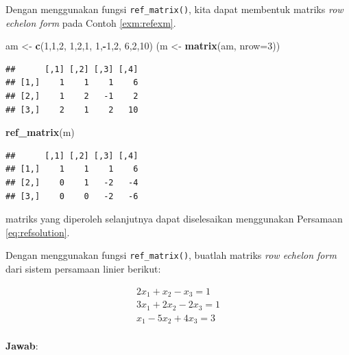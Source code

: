 \documentclass[]{book}
\newenvironment{Shaded}{\begin{snugshade}}{\end{snugshade}}
\newcommand{\DataTypeTok}[1]{\textcolor[rgb]{0.13,0.29,0.53}{#1}}
\newcommand{\DecValTok}[1]{\textcolor[rgb]{0.00,0.00,0.81}{#1}}
\newcommand{\KeywordTok}[1]{\textcolor[rgb]{0.13,0.29,0.53}{\textbf{#1}}}
\newcommand{\NormalTok}[1]{#1}
\newcommand{\OperatorTok}[1]{\textcolor[rgb]{0.81,0.36,0.00}{\textbf{#1}}}
\newcommand{\StringTok}[1]{\textcolor[rgb]{0.31,0.60,0.02}{#1}}
\theoremstyle{definition}
\theoremstyle{definition}
\theoremstyle{definition}
\theoremstyle{remark}
\let\BeginKnitrBlock\begin \let\EndKnitrBlock\end
\begin{document}
Dengan menggunakan fungsi \texttt{ref\_matrix()}, kita dapat membentuk matriks \emph{row echelon form} pada Contoh \ref{exm:refexm}.

\begin{Shaded}
\begin{Highlighting}[]
\NormalTok{am <-}\StringTok{ }\KeywordTok{c}\NormalTok{(}\DecValTok{1}\NormalTok{,}\DecValTok{1}\NormalTok{,}\DecValTok{2}\NormalTok{,}
        \DecValTok{1}\NormalTok{,}\DecValTok{2}\NormalTok{,}\DecValTok{1}\NormalTok{,}
        \DecValTok{1}\NormalTok{,}\OperatorTok{-}\DecValTok{1}\NormalTok{,}\DecValTok{2}\NormalTok{,}
        \DecValTok{6}\NormalTok{,}\DecValTok{2}\NormalTok{,}\DecValTok{10}\NormalTok{)}
\NormalTok{(m <-}\StringTok{ }\KeywordTok{matrix}\NormalTok{(am, }\DataTypeTok{nrow=}\DecValTok{3}\NormalTok{))}
\end{Highlighting}
\end{Shaded}

\begin{verbatim}
##      [,1] [,2] [,3] [,4]
## [1,]    1    1    1    6
## [2,]    1    2   -1    2
## [3,]    2    1    2   10
\end{verbatim}

\begin{Shaded}
\begin{Highlighting}[]
\KeywordTok{ref_matrix}\NormalTok{(m)}
\end{Highlighting}
\end{Shaded}

\begin{verbatim}
##      [,1] [,2] [,3] [,4]
## [1,]    1    1    1    6
## [2,]    0    1   -2   -4
## [3,]    0    0   -2   -6
\end{verbatim}

matriks yang diperoleh selanjutnya dapat diselesaikan menggunakan Persamaan \eqref{eq:refsolution}.

\BeginKnitrBlock{example}
\protect\hypertarget{exm:refexm2}{}{\label{exm:refexm2} }Dengan menggunakan fungsi \texttt{ref\_matrix()}, buatlah matriks \emph{row echelon form} dari sistem persamaan linier berikut:
\EndKnitrBlock{example}

\[
\begin{matrix}
  2x_1+x_2-x_3=1 \\
  3x_1+2x_2-2x_3=1 \\
  x_1-5x_2+4x_3=3 \\
\end{matrix}
\]

\textbf{Jawab}:
\end{document}
